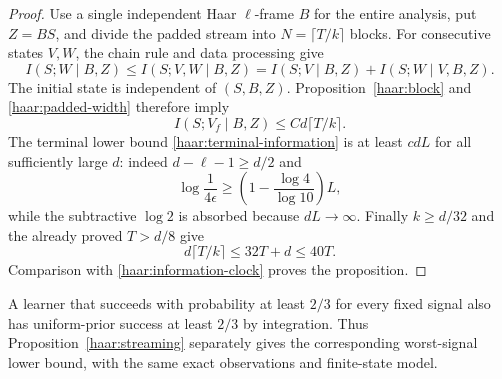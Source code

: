 \begin{proof}
Use a single independent Haar $\ell$-frame $B$ for the entire analysis,
put $Z=BS$, and divide the padded stream into
$N=\lceil T/k\rceil$ blocks.  For consecutive states $V,W$, the chain
rule and data processing give
\[
 I(S;W\mid B,Z)
 \le I(S;V,W\mid B,Z)
 =I(S;V\mid B,Z)+I(S;W\mid V,B,Z).
\]
The initial state is independent of $(S,B,Z)$.  Proposition~\ref{haar:block}
and \eqref{haar:padded-width} therefore imply
\begin{equation}\label{haar:information-clock}
 I(S;V_f\mid B,Z)\le Cd\lceil T/k\rceil.
\end{equation}
The terminal lower bound \eqref{haar:terminal-information} is at least
$c dL$ for all sufficiently large $d$: indeed
$d-\ell-1\ge d/2$ and
\[
 \log\frac1{4\epsilon}
 \ge\left(1-\frac{\log4}{\log10}\right)L,
\]
while the subtractive $\log2$ is absorbed because $dL\to\infty$.
Finally $k\ge d/32$ and the already proved $T>d/8$ give
\[
 d\lceil T/k\rceil\le32T+d\le40T.
\]
Comparison with \eqref{haar:information-clock} proves the proposition.
\end{proof}

A learner that succeeds with probability at least $2/3$ for every fixed
signal also has uniform-prior success at least $2/3$ by integration.
Thus Proposition~\ref{haar:streaming} separately gives the corresponding
worst-signal lower bound, with the same exact observations and finite-state
model.
